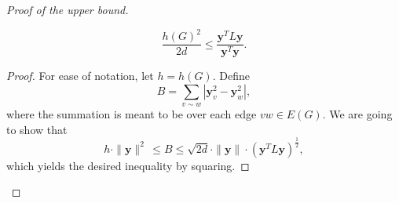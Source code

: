 \begin{proof}[Proof of the upper bound]
    \begin{claim} \label{claim:cheeger-lower}
        \begin{equation*}
            \frac{h(G)^2}{2d} \le \frac{\bm{y}^T L \bm{y}}{\bm{y}^T \bm{y}}.
        \end{equation*}
    \end{claim}

    \begin{proof}
        For ease of notation, let $h = h(G)$.
        Define
        \begin{equation*}
            B = \sum \limits_{v \sim w} | \bm{y}_v^2 - \bm{y}_w^2 |,
        \end{equation*}
        where the summation is meant to be over each edge $vw \in E(G)$.
        We are going to show that 
        \begin{equation*}
            h \cdot \|\bm{y} \|^2\, \le B \le \sqrt{2d} \cdot \|\bm{y} \| \cdot (\bm{y}^T L \bm{y})^{\frac{1}{2}},
        \end{equation*}
        which yields the desired inequality by squaring.


\end{proof}
\end{proof}
